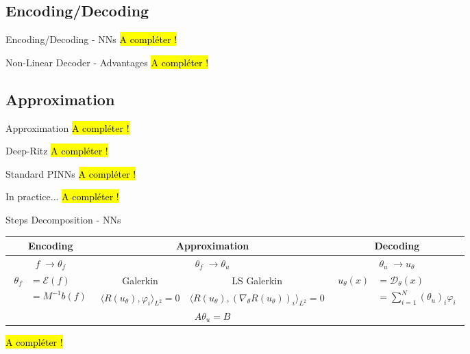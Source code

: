 \subsection{Encoding/Decoding}

\begin{frame}{Encoding/Decoding - NNs}
	\hl{A compléter !}
\end{frame}

\begin{frame}{Non-Linear Decoder - Advantages}
	\hl{A compléter !}
\end{frame}

\subsection{Approximation}

\begin{frame}{Approximation}
	\hl{A compléter !}
\end{frame}

\begin{frame}{Deep-Ritz}
	\hl{A compléter !}
\end{frame}

\begin{frame}{Standard PINNs}
	\hl{A compléter !}
\end{frame}

\begin{frame}{In practice...}
	\hl{A compléter !}
\end{frame}

\begin{frame}{Steps Decomposition - NNs}
	\begin{center}
		\renewcommand{\arraystretch}{1.5}
		\begin{tabular}{|c|c|c|c|}
			\hline
			\textbf{Encoding} & \multicolumn{2}{c|}{\textbf{Approximation}} & \textbf{Decoding} \\
			\hline
			$f \; \rightarrow \theta_f$ & \multicolumn{2}{c|}{$\theta_f \; \rightarrow \theta_u$} & $\theta_u \; \rightarrow u_\theta$ \\
			\hline
			\multirow{3}{*}{$\begin{aligned}
					\theta_f&=\mathcal{E}(f) \\
					&=M^{-1}b(f)
				\end{aligned}$} & Galerkin & LS Galerkin & \multirow{3}{*}{$\begin{aligned}
					u_\theta(x)&=\mathcal{D}_\theta(x) \\
					&=\sum_{i=1}^N (\theta_u)_i\varphi_i
				\end{aligned}$} \\
			& \small $\langle R(u_\theta),\varphi_i\rangle_{L^2}=0$ & \small $\langle R(u_\theta),(\nabla_\theta R(u_\theta))_i\rangle_{L^2}=0$ & \\
			\cline{2-3}
			& \multicolumn{2}{c|}{$A\theta_u=B$} & \\
			\hline
		\end{tabular}
	\end{center}
	
	\hl{A compléter !}
\end{frame}

